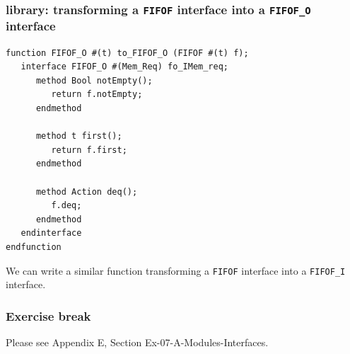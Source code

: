 \begin{frame}[fragile]
\frametitle{{\BSV} library: transforming a {\tt FIFOF} interface into a {\tt FIFOF\_O} interface}

\footnotesize

\begin{Verbatim}[frame=single]
function FIFOF_O #(t) to_FIFOF_O (FIFOF #(t) f);
   interface FIFOF_O #(Mem_Req) fo_IMem_req;
      method Bool notEmpty();
         return f.notEmpty;
      endmethod

      method t first();
         return f.first;
      endmethod

      method Action deq();
         f.deq;
      endmethod
   endinterface
endfunction
\end{Verbatim}

\PAUSE{\vspace{4ex}}

We can write a similar function transforming a {\tt FIFOF} interface
into a {\tt FIFOF\_I} interface.

\end{frame}


\begin{frame}
\frametitle{\EmojiExercise \hmm Exercise break}

Please see Appendix E, Section Ex-07-A-Modules-Interfaces.

\end{frame}


